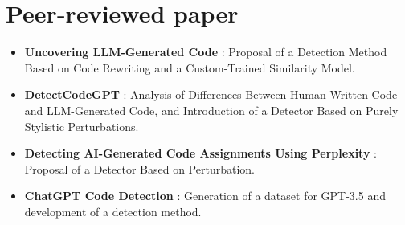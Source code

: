 \section*{Peer-reviewed paper}
\begin{itemize}
    \item \textbf{Uncovering LLM-Generated Code} \cite{ye2025uncovering}: 
    Proposal of a Detection Method Based on Code Rewriting and a Custom-Trained Similarity Model.

    \item \textbf{DetectCodeGPT} \cite{shi2024between}: 
    Analysis of Differences Between Human-Written Code and LLM-Generated Code, 
    and Introduction of a Detector Based on Purely Stylistic Perturbations.
    
    \item \textbf{Detecting AI-Generated Code Assignments Using Perplexity} \cite{xu2024detecting}: 
    Proposal of a Detector Based on Perturbation.

    \item \textbf{ChatGPT Code Detection} \cite{oedingen2024chatgpt}:
    Generation of a dataset for GPT-3.5 and development of a detection method.
    

\end{itemize}
